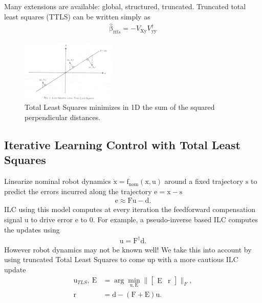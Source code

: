 \documentclass[10pt,a4paper]{article}
\newcommand{\boldvec}[1]{\boldsymbol{\mathrm{#1}}}
\let\vec\boldvec
\newcommand{\state}{\vec{x}} %
\newcommand{\error}{\vec{e}} %
\newcommand{\traj}{\vec{s}} %
\newcommand{\linDist}{\vec{d}} %
\newcommand{\sysInput}{\vec{u}} %
\newcommand{\designMat}{\vec{X}} %
\newcommand{\observations}{\vec{y}} %
\newcommand{\param}{\vec{\beta}} %
\newcommand{\residual}{\vec{r}} %
\newcommand{\errorMat}{\vec{E}} %
\newcommand{\systemMat}{\vec{F}} %
\newcommand{\dynamics}{\vec{f}}
\newcommand{\dynamicsNominal}{\dynamics_{\mathrm{nom}}}
\begin{document}
Many extensions are available: global, structured, truncated. %
Truncated total least squares (TTLS) can be written simply as
%
\begin{equation}
\begin{aligned}
\hat{\param}_{ttls} = -V_{\designMat \observations}V_{\observations \observations}^{\dagger}
\end{aligned}
\end{equation}
%

\begin{figure}
\centering
\includegraphics[width=0.4\textwidth]{LSvsTLS.jpg}%
\caption{Total Least Squares minimizes in 1D the sum of the squared perpendicular distances.}
\end{figure}
%
\subsection{Iterative Learning Control with Total Least Squares}\label{ilcTLS}
%
Linearize nominal robot dynamics $\dot{\state} = \dynamicsNominal(\state,\sysInput)$ around a fixed trajectory $\traj$ to predict the errors incurred along the trajectory $\error = \state - \traj$
%
\begin{equation}
\begin{aligned}
\error \approx \systemMat \sysInput - \linDist.
\end{aligned}
\end{equation}
%
ILC using this model computes at every iteration the feedforward compensation signal $\sysInput$ to drive error $\error$ to $\vec{0}$. For example, a pseudo-inverse based ILC computes the updates using
%
\begin{equation}
\begin{aligned}
\sysInput = \systemMat^{\dagger}\linDist.
\end{aligned}
\end{equation}
%
However robot dynamics may not be known well! We take this into account by using truncated Total Least Squares to come up with a more cautious ILC update
%
\begin{equation}
\begin{aligned}
\sysInput_{TLS}, \ \errorMat &= \arg\min_{\sysInput,\errorMat} \|\begin{bmatrix}\errorMat & \residual \end{bmatrix} \|_{F}, \\
\residual &= \linDist - (\systemMat + \errorMat)\sysInput.
\end{aligned}
\end{equation}
%
\end{document}
